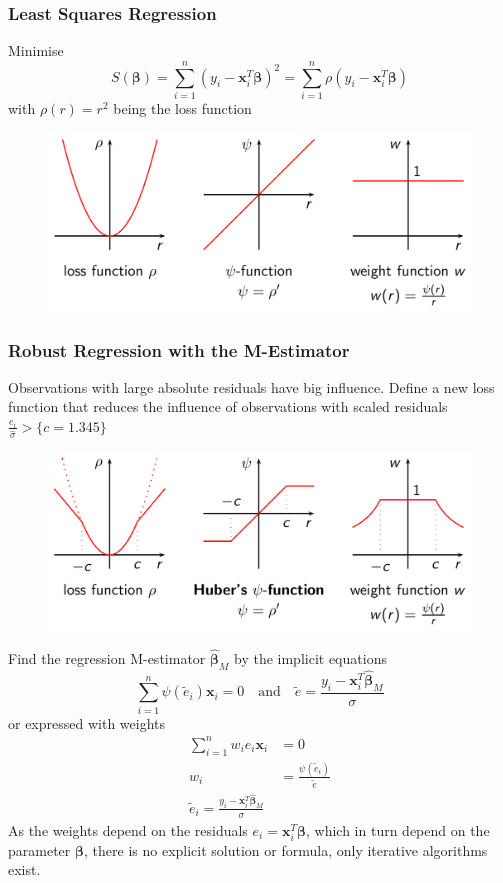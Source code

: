 \documentclass[11pt]{article}
\theoremstyle{definition}
\begin{document}
\subsubsection{Least Squares Regression}
Minimise
\begin{equation*}
	S(\bm{\beta}) = \sum_{i=1}^n(y_i - \bm{x}_i^T\bm{\beta})^2 = \sum_{i=1}^{n}\rho(y_i - \bm{x}_i^T\bm{\beta})
\end{equation*}
with $\rho(r) = r^2$ being the loss function
\begin{figure}[H]
	\centering
	\includegraphics[width=0.8\linewidth]{img/loss_function}
\end{figure}

\subsubsection{Robust Regression with the M-Estimator}
Observations with large absolute residuals have big influence. Define a new loss function that reduces the  influence of observations with scaled residuals $\frac{e_i}{\hat{\sigma}} > \{c=1.345\}$
\begin{figure}[H]
	\centering
	\includegraphics[width=0.8\linewidth]{img/robust_m_estimator.png}
\end{figure}
\noindent
Find the regression M-estimator $\hat{\bm{\beta}}_M$ by the implicit equations
\begin{equation*}
	\sum_{i=1}^{n}\psi(\tilde{e}_i)\bm{x}_i = 0\quad\text{and}\quad\tilde{e}=\frac{y_i - \bm{x}_i^T\hat{\bm{\beta}}_M}{\sigma}
\end{equation*}
or expressed with weights
\begin{align*}
	\sum_{i=1}^{n}w_i e_i\bm{x}_i &= 0\\
	w_i &= \frac{\psi(\tilde{e}_i)}{\tilde{e}}\\
	\tilde{e}_i = \frac{y_i -\bm{x}_i^T\hat{\bm{\beta}}_M}{\sigma}
\end{align*}
As the weights depend on the residuals $e_i = \bm{x}_i^T\bm{\beta}$, which in turn depend on the parameter $\bm{\beta}$, there is no explicit solution or formula, only iterative algorithms exist.
\end{document}
